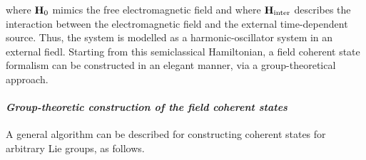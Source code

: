 \documentclass{homework}
\begin{document}
where ${\bf H}_0$ mimics the free electromagnetic field and where ${\bf H}_{\textnormal{inter}}$ describes the interaction between the electromagnetic field and the external time-dependent source. Thus, the system is modelled as a harmonic-oscillator system in an external fiedl. Starting from this semiclassical Hamiltonian, a field coherent state formalism can be constructed in an elegant manner, via a group-theoretical approach. \\

\paragraph{\textit{Group-theoretic construction of the field coherent states}}

A general algorithm can be described for constructing coherent states for arbitrary Lie groups, as follows.
\end{document}
